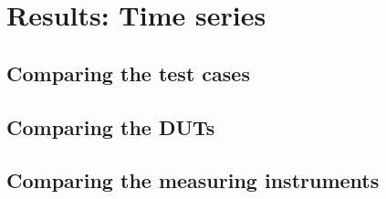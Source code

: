 \section{Results: Time series}

\subsection{Comparing the test cases}



\subsection{Comparing the DUTs}



\subsection{Comparing the measuring instruments}


